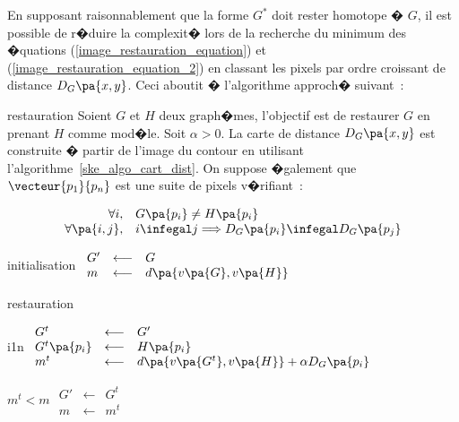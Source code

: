 
En supposant raisonnablement que la forme $G^*$ doit rester homotope � $G$, il est possible de r�duire la complexit� lors de la recherche du minimum des �quations (\ref{image_restauration_equation}) et (\ref{image_restauration_equation_2}) en classant les pixels par ordre croissant de distance $D_G\pa{x,y}$. Ceci aboutit � l'algorithme approch� suivant~:

            \begin{xalgorithm}{restauration}
            Soient $G$ et $H$ deux graph�mes, l'objectif est de restaurer $G$ en prenant $H$ comme mod�le. 
            Soit $\alpha > 0$.
            La carte de distance $D_G\pa{x,y}$ est construite � partir de l'image du contour en utilisant
            l'algorithme~\ref{ske_algo_cart_dist}. On suppose �galement que $\vecteur{p_1}{p_n}$ est une suite 
            de pixels v�rifiant~:
            
                    $$
                    \begin{array}{rl}
                    \forall i,                 & G\pa{p_i} \neq H\pa{p_i} \\
                    \forall \pa{i,j}, &  i \infegal j \Longrightarrow D_G\pa{p_i} \infegal D_G\pa{p_j}
                    \end{array}
                    $$
            
            
            \begin{xalgostep}{initialisation}
            $\begin{array}{lll}
            G' &\longleftarrow& G \\
            m  &\longleftarrow& d\pa{v\pa{G},v\pa{H}}
            \end{array}$
            \end{xalgostep}
            
            \begin{xalgostep}{restauration}
            \begin{xfor}{i}{1}{n}
            $\begin{array}{lll}
            G^t                 &\longleftarrow& G' \\
            G^t\pa{p_i} &\longleftarrow& H\pa{p_i} \\
            m^t                    &\longleftarrow& d\pa{v\pa{G^t},v\pa{H}} + \alpha D_G\pa{p_i}
            \end{array}$ \\
            \begin{xif}{$m^t < m$}
            $\begin{array}{lll}
            G' &\longleftarrow& G^t \\
            m  &\longleftarrow& m^t
            \end{array}$
            \end{xif}
            \end{xfor}
            \end{xalgostep}
            
            \end{xalgorithm}
        

